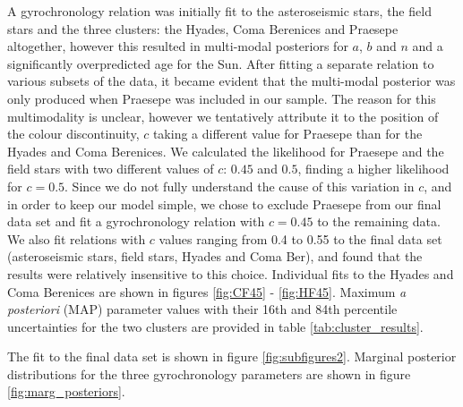 \documentclass[10pt,preprint]{aastex}
\begin{document}
A gyrochronology relation was initially fit to the asteroseismic stars, the field stars and the three clusters: the Hyades, Coma Berenices and Praesepe altogether, however this resulted in multi-modal posteriors for $a$, $b$ and $n$ and a significantly overpredicted age for the Sun.
After fitting a separate relation to various subsets of the data, it became evident that the multi-modal posterior was only produced when Praesepe was included in our sample.
The reason for this multimodality is unclear, however we tentatively attribute it to the position of the colour discontinuity, $c$ taking a different value for Praesepe than for the Hyades and Coma Berenices.
We calculated the likelihood for Praesepe and the field stars with two different values of $c$: $0.45$ and $0.5$, finding a higher likelihood for $c=0.5$.
Since we do not fully understand the cause of this variation in $c$, and in order to keep our model simple, we chose to exclude Praesepe from our final data set and fit a gyrochronology relation with $c=0.45$ to the remaining data.
We also fit relations with $c$ values ranging from 0.4 to 0.55 to the final data set (asteroseismic stars, field stars, Hyades and Coma Ber), and found that the results were relatively insensitive to this choice.
Individual fits to the Hyades and Coma Berenices are shown in figures \ref{fig:CF45} - \ref{fig:HF45}.
Maximum {\it a posteriori} (MAP) parameter values with their 16th and 84th percentile uncertainties for the two clusters are provided in table \ref{tab:cluster_results}.

The fit to the final data set is shown in figure \ref{fig:subfigures2}.
Marginal posterior distributions for the three gyrochronology parameters are shown in figure \ref{fig:marg_posteriors}.
\end{document}
